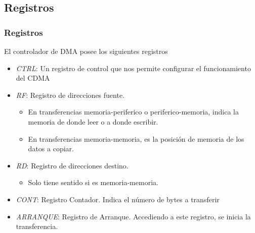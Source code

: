 \documentclass{beamer}
\begin{document}
\subsection{Registros}
\begin{frame}
\frametitle{Registros}
  El controlador de DMA posee los siguientes registros
\begin{itemize}
 \item \emph{CTRL}: Un registro de control que nos permite configurar el funcionamiento del CDMA
 \item \emph{RF}: Registro de direcciones fuente.
  \begin{itemize}
    \item En transferencias memoria-periferico o periferico-memoria, indica la memoria de donde leer o a donde escribir.
    \item En transferencias memoria-memoria, es la posición de memoria de los datos a copiar.
  \end{itemize}
 
 \item \emph{RD}: Registro de direcciones destino. 
  \begin{itemize}
    \item Solo tiene sentido si es memoria-memoria.
  \end{itemize}
 \item \emph{CONT}: Registro Contador. Indica el número de bytes a transferir
 \item \emph{ARRANQUE}: Registro de Arranque. Accediendo a este registro, se inicia la transferencia.
\end{itemize}
\end{frame}
\end{document}
